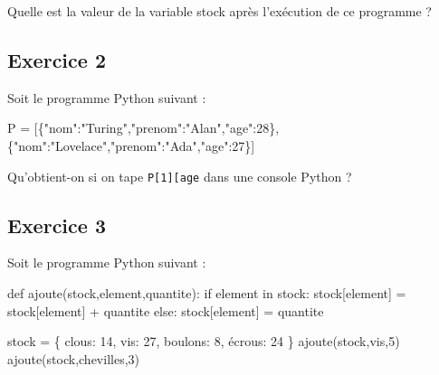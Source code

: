 \documentclass[
  a4paper,
  DIV=11,
  numbers=noendperiod]{scrartcl}
\newenvironment{Shaded}{\begin{snugshade}}{\end{snugshade}}
\newcommand{\ControlFlowTok}[1]{\textcolor[rgb]{0.00,0.23,0.31}{#1}}
\newcommand{\DecValTok}[1]{\textcolor[rgb]{0.68,0.00,0.00}{#1}}
\newcommand{\KeywordTok}[1]{\textcolor[rgb]{0.00,0.23,0.31}{#1}}
\newcommand{\NormalTok}[1]{\textcolor[rgb]{0.00,0.23,0.31}{#1}}
\newcommand{\OperatorTok}[1]{\textcolor[rgb]{0.37,0.37,0.37}{#1}}
\newcommand{\StringTok}[1]{\textcolor[rgb]{0.13,0.47,0.30}{#1}}
\begin{document}
Quelle est la valeur de la variable stock après l'exécution de ce
programme ?

\hypertarget{fa-solid-pencil-alt-exercice-2}{%
\subsection{\texorpdfstring{ Exercice
2}{ Exercice 2}}\label{fa-solid-pencil-alt-exercice-2}}

Soit le programme Python suivant :

\begin{Shaded}
\begin{Highlighting}[]
\NormalTok{P }\OperatorTok{=}\NormalTok{ [\{}\StringTok{"nom"}\NormalTok{:}\StringTok{"Turing"}\NormalTok{,}\StringTok{"prenom"}\NormalTok{:}\StringTok{"Alan"}\NormalTok{,}\StringTok{"age"}\NormalTok{:}\DecValTok{28}\NormalTok{\},\{}\StringTok{"nom"}\NormalTok{:}\StringTok{"Lovelace"}\NormalTok{,}\StringTok{"prenom"}\NormalTok{:}\StringTok{"Ada"}\NormalTok{,}\StringTok{"age"}\NormalTok{:}\DecValTok{27}\NormalTok{\}]}
\end{Highlighting}
\end{Shaded}

Qu'obtient-on si on tape
\texttt{P{[}1{]}{[}\textquotesingle{}age\textquotesingle{}{]}} dans une
console Python ?

\hypertarget{fa-solid-pencil-alt-exercice-3}{%
\subsection{\texorpdfstring{ Exercice
3}{ Exercice 3}}\label{fa-solid-pencil-alt-exercice-3}}

Soit le programme Python suivant :

\begin{Shaded}
\begin{Highlighting}[]
\KeywordTok{def}\NormalTok{ ajoute(stock,element,quantite):}
  \ControlFlowTok{if}\NormalTok{ element }\KeywordTok{in}\NormalTok{ stock:}
\NormalTok{    stock[element] }\OperatorTok{=}\NormalTok{ stock[element] }\OperatorTok{+}\NormalTok{ quantite}
  \ControlFlowTok{else}\NormalTok{:}
\NormalTok{    stock[element] }\OperatorTok{=}\NormalTok{ quantite}

\NormalTok{stock }\OperatorTok{=}\NormalTok{ \{ }\StringTok{\textquotesingle{}clous\textquotesingle{}}\NormalTok{: }\DecValTok{14}\NormalTok{, }\StringTok{\textquotesingle{}vis\textquotesingle{}}\NormalTok{: }\DecValTok{27}\NormalTok{, }\StringTok{\textquotesingle{}boulons\textquotesingle{}}\NormalTok{: }\DecValTok{8}\NormalTok{, }\StringTok{\textquotesingle{}écrous\textquotesingle{}}\NormalTok{: }\DecValTok{24}\NormalTok{ \}}
\NormalTok{ajoute(stock,}\StringTok{\textquotesingle{}vis\textquotesingle{}}\NormalTok{,}\DecValTok{5}\NormalTok{)}
\NormalTok{ajoute(stock,}\StringTok{\textquotesingle{}chevilles\textquotesingle{}}\NormalTok{,}\DecValTok{3}\NormalTok{)}
\end{Highlighting}
\end{Shaded}
\end{document}
